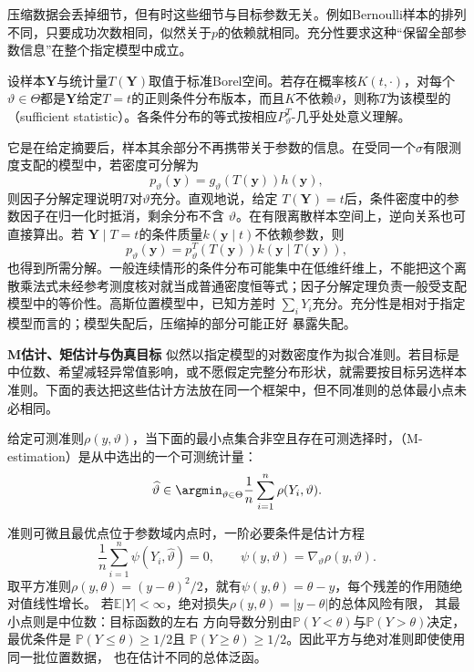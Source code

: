 压缩数据会丢掉细节，但有时这些细节与目标参数无关。例如Bernoulli样本的排列不同，只要成功次数相同，似然关于\(p\)的依赖就相同。充分性要求这种“保留全部参数信息”在整个指定模型中成立。
\begin{definition}[充分统计量]
  \label{def:statistics-sufficient-statistic}
  设样本\(\bm Y\)与统计量\(T(\bm Y)\)取值于标准Borel空间。若存在概率核\(K(t,\cdot)\)，对每个\(\vartheta\in\Theta\)都是\(\bm Y\)给定\(T=t\)的正则条件分布版本，而且\(K\)不依赖\(\vartheta\)，则称\(T\)为该模型的（sufficient statistic）。各条件分布的等式按相应\(P_\vartheta^T\)-几乎处处意义理解。
\end{definition}
它是在给定摘要后，样本其余部分不再携带关于参数的信息。在受同一个\(\sigma\)有限测度支配的模型中，若密度可分解为
\[
  p_\vartheta(\bm y)=g_\vartheta(T(\bm y))h(\bm y),
\]
则因子分解定理说明\(T\)对\(\vartheta\)充分。直观地说，给定
\(T(\bm Y)=t\)后，条件密度中的参数因子在归一化时抵消，剩余分布不含
\(\vartheta\)。在有限离散样本空间上，逆向关系也可直接算出。若
\(\bm Y\mid T=t\)的条件质量\(k(\bm y\mid t)\)不依赖参数，则
\[
  p_\vartheta(\bm y)
  =p_\vartheta^T(T(\bm y))k(\bm y\mid T(\bm y)),
\]
也得到所需分解。一般连续情形的条件分布可能集中在低维纤维上，不能把这个离散乘法式未经参考测度核对就当成普通密度恒等式；因子分解定理负责一般受支配模型中的等价性。高斯位置模型中，已知方差时
\(\sum_iY_i\)充分。充分性是相对于指定模型而言的；模型失配后，压缩掉的部分可能正好
暴露失配。

\par\medskip\noindent\textbf{M估计、矩估计与伪真目标}\quad
似然以指定模型的对数密度作为拟合准则。若目标是中位数、希望减轻异常值影响，或不愿假定完整分布形状，就需要按目标另选样本准则。下面的表达把这些估计方法放在同一个框架中，但不同准则的总体最小点未必相同。
\begin{definition}[M估计]
  \label{def:statistics-m-estimator}
给定可测准则\(\rho(y,\vartheta)\)，当下面的最小点集合非空且存在可测选择时，（M-estimation）是从中选出的一个可测统计量：
\[
  \widehat\vartheta
  \in\argmin_{\vartheta\in\Theta}
  \frac1n\sum_{i=1}^n\rho(Y_i,\vartheta).
\]
\end{definition}
准则可微且最优点位于参数域内点时，一阶必要条件是估计方程
\[
  \frac1n\sum_{i=1}^n\psi(Y_i,\widehat\vartheta)=0,
  \qquad
  \psi(y,\vartheta)=\nabla_\vartheta\rho(y,\vartheta).
\]
取平方准则\(\rho(y,\theta)=(y-\theta)^2/2\)，就有\(\psi(y,\theta)=\theta-y\)，每个残差的作用随绝对值线性增长。
若\(\mathbb E|Y|<\infty\)，绝对损失\(\rho(y,\theta)=|y-\theta|\)的总体风险有限，
其最小点则是中位数：目标函数的左右
方向导数分别由\(\mathbb{P}(Y<\theta)\)与\(\mathbb{P}(Y>\theta)\)决定，最优条件是
\(\mathbb{P}(Y\leq\theta)\geq1/2\)且
\(\mathbb{P}(Y\geq\theta)\geq1/2\)。因此平方与绝对准则即使使用同一批位置数据，
也在估计不同的总体泛函。

